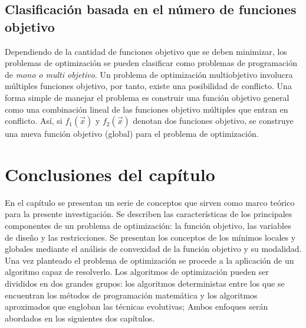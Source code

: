 \subsection{Clasificación basada en el número de funciones objetivo} 
Dependiendo de la cantidad de funciones objetivo que se deben minimizar, los problemas de optimización se pueden clasificar como problemas de programación de \textit{mono o multi objetivo}. Un problema de optimización multiobjetivo involucra múltiples funciones objetivo, por tanto, existe una posibilidad de conflicto. Una forma simple de manejar el problema es construir una función objetivo general como una combinación lineal de las funciones objetivo múltiples que entran en conflicto. Así, si $f_1(\vec{x})$ y $f_2 (\vec{x})$ denotan dos funciones objetivo, se construye una nueva función objetivo (global) para el problema de optimización.


\section{Conclusiones del capítulo}
En el capítulo se presentan un serie de conceptos que sirven como marco teórico para la presente investigación. Se describen las características de los principales componentes de un problema de optimización: la  función objetivo, las variables de diseño y las restricciones. Se presentan los conceptos de los mínimos locales y globales mediante el análisis de convexidad de la función objetivo y su modalidad. Una vez planteado el problema de optimización se procede a la aplicación de un algoritmo capaz de resolverlo. Los algoritmos de optimización pueden ser divididos en dos grandes grupos: los algoritmos deterministas entre los que se encuentran los métodos de programación matemática y los algoritmos aproximados que engloban las técnicas evolutivas; Ambos enfoques serán abordados en los siguientes dos capítulos.